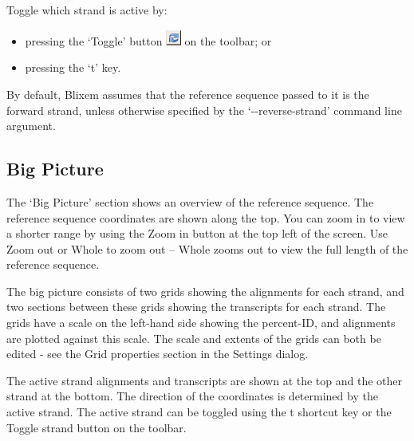\documentclass[letterpaper]{article}
\newcommand\liststyleWWviiiNumxxxvi{%
\renewcommand\labelitemi{{\textbullet}}
\renewcommand\labelitemii{o}
\renewcommand\labelitemiii{[F0A7?]}
\renewcommand\labelitemiv{[F0B7?]}
}
\begin{document}
\bigskip

{Toggle which strand is active by:}

\liststyleWWviiiNumxxxvi
\begin{itemize}
\item {
pressing the {\textquoteleft}Toggle{\textquoteright} button 
\includegraphics[width=0.496cm,height=0.533cm]{img_button_toggle_strand.png} 
on the toolbar; or}
\item {
pressing the {\textquoteleft}t{\textquoteright} key.}
\end{itemize}

\bigskip

{By default, Blixem assumes that the reference sequence passed to it is
the forward strand, unless otherwise specified by the
{\textquoteleft}-{}-reverse-strand{\textquoteright} command line
argument.}

{\color[rgb]{0.30980393,0.5058824,0.7411765}\subsection[Big Picture]{Big Picture}}
\hypertarget{RefHeading1641056909880}{}{
The {\textquoteleft}Big Picture{\textquoteright} section shows an
overview of the reference sequence. The reference sequence
coordinates are shown along the top. You can zoom in to view a
shorter range by using the {\textquotesingle}Zoom in{\textquotesingle}
button at the top left of the screen. Use {\textquotesingle}Zoom
out{\textquotesingle} or {\textquotesingle}Whole{\textquotesingle} to
zoom out -- {\textquotesingle}Whole{\textquotesingle} zooms out to view
the full length of the reference sequence.}

\bigskip

{The big picture consists of two grids showing the alignments for each
strand, and two sections between these grids showing the transcripts
for each strand. The grids have a scale on the left-hand side showing
the percent-ID, and alignments are plotted against this scale. The
scale and extents of the grids can both be edited - see the Grid
properties section in the Settings dialog.}


\bigskip

{
The active strand alignments and transcripts are shown at the top and
the other strand at the bottom. The direction of the coordinates is
determined by the active strand. The active strand can be toggled
using the {\textquotesingle}t{\textquotesingle} shortcut key or the
{\textquotesingle}Toggle strand{\textquotesingle} button on the
toolbar.}
\end{document}
